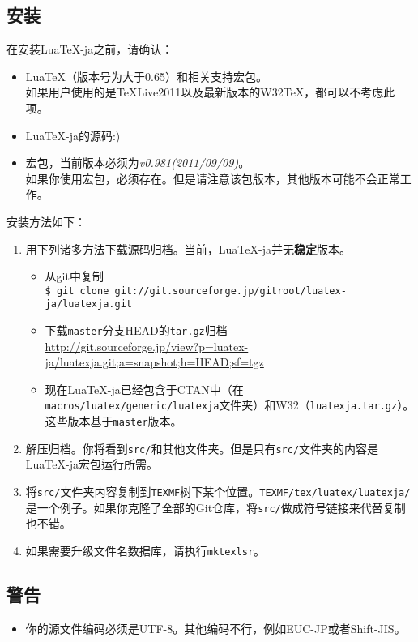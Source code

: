 \documentclass{ltjarticle}
\DeclareRobustCommand\LuaTeX{Lua\TeX}
\begin{document}
\subsection{安装}
在安装\LuaTeX-ja之前，请确认：
\begin{itemize}
\item \LuaTeX（版本号为大于0.65）和相关支持宏包。\\
如果用户使用的是\TeX Live2011以及最新版本的W32\TeX，都可以不考虑此项。
\item \LuaTeX-ja的源码:)
\item {}宏包，当前版本必须为\textit{v0.981(2011/09/09)}。\\
如果你使用宏包，必须存在。但是请注意该包版本，其他版本可能不会正常工作。
\end{itemize}
安装方法如下：
\begin{enumerate}
\item 用下列诸多方法下载源码归档。当前，\LuaTeX-ja并无\textbf{稳定}版本。
	\begin{itemize}
	\item 从git中复制\\
		\verb!$ git clone git://git.sourceforge.jp/gitroot/luatex-ja/luatexja.git!
	\item 下载\texttt{master}分支HEAD的\texttt{tar.gz}归档\\
		\url{http://git.sourceforge.jp/view?p=luatex-ja/luatexja.git;a=snapshot;h=HEAD;sf=tgz}
	\item 现在\LuaTeX-ja已经包含于CTAN中（在\texttt{macros/luatex/generic/luatexja}文件夹）和W32（\texttt{luatexja.tar.gz}）。这些版本基于\texttt{master}版本。
	\end{itemize}
\item 解压归档。你将看到\texttt{src/}和其他文件夹。但是只有\texttt{src/}文件夹的内容是\LuaTeX-ja宏包运行所需。
\item 将\texttt{src/}文件夹内容复制到\texttt{TEXMF}树下某个位置。\texttt{TEXMF/tex/luatex/luatexja/}是一个例子。如果你克隆了全部的Git仓库，将\texttt{src/}做成符号链接来代替复制也不错。
\item 如果需要升级文件名数据库，请执行\texttt{mktexlsr}。
\end{enumerate}
\subsection{警告}
\begin{itemize}
\item 你的源文件编码必须是UTF-8。其他编码不行，例如EUC-JP或者Shift-JIS。
\end{itemize}
\end{document}
